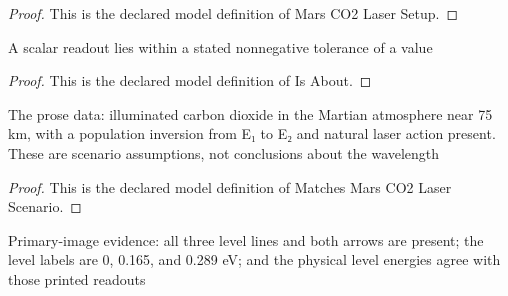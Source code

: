\begin{proof}
  This is the declared model definition of Mars CO2 Laser Setup.
\end{proof}
\begin{definition}[Is About]
  \label{def:physics:phyx-mini-0579:phyxminiproblems-problemphyxmini0579-isabout}
  A scalar readout lies within a stated nonnegative tolerance of a value
\end{definition}
\begin{proof}
  This is the declared model definition of Is About.
\end{proof}
\begin{definition}
  \label{def:physics:phyx-mini-0579:phyxminiproblems-problemphyxmini0579-matchesmarsco2laserscenario}
  The prose data: illuminated carbon dioxide in the Martian atmosphere near 75 km, with a population inversion from E₁ to E₂ and natural laser action present. These are scenario assumptions, not conclusions about the wavelength
\end{definition}
\begin{proof}
  This is the declared model definition of Matches Mars CO2 Laser Scenario.
\end{proof}
\begin{definition}
  \label{def:physics:phyx-mini-0579:phyxminiproblems-problemphyxmini0579-matchessuppliedco2energylevelfigure}
  Primary-image evidence: all three level lines and both arrows are present; the level labels are 0, 0.165, and 0.289 eV; and the physical level energies agree with those printed readouts
\end{definition}
